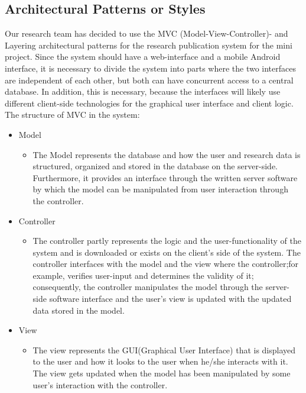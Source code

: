 \documentclass[a4paper,12pt]{article}
\begin{document}
\subsection{Architectural Patterns or Styles}
	Our research team has decided to use the MVC (Model-View-Controller)- and
	Layering architectural patterns for the research publication system for the mini
	project. Since the system should have a web-interface and a mobile Android interface,
	it is necessary to divide the system into parts where the two interfaces are independent
	of each other, but both can have concurrent access to a central database. In addition,
	this is necessary, because the interfaces will likely use different client-side
	technologies for the graphical user interface and client logic.
	\newline
	\newline
	The structure of MVC in the system:
	\begin{itemize}
		\item Model
		\begin{itemize}
			\item[] The Model represents the database and how the user and research
			data is structured, organized and stored in the database on the server-side. Furthermore, it provides an interface through the written server
			software by which the model can be manipulated from user interaction
			through the controller.
		\end{itemize}
		\item Controller
		\begin{itemize}
			\item[] The controller partly represents the logic and the user-functionality
			of the system and is downloaded or exists on the client's side of the
			system. The controller interfaces with the model and the view
			where the controller;for example, verifies user-input and determines the validity
			of it; consequently, the controller manipulates the model through
			the server-side software interface and the user's view is updated
			with the updated data stored in the model.
		\end{itemize}
		\item View
		\begin{itemize}
			\item[] The view represents the GUI(Graphical User Interface) that is displayed
			to the user and how it looks to the user when he/she interacts with it.
			The view gets updated when the model has been manipulated by some user's
			interaction with the controller.
		\end{itemize}
	\end{itemize}
\end{document}
